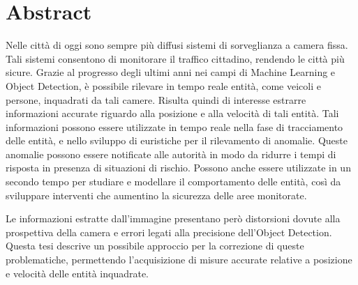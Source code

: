 \chapter*{Abstract}
Nelle città di oggi sono sempre più diffusi sistemi di sorveglianza a camera fissa.
Tali sistemi consentono di monitorare il traffico cittadino, rendendo le città più sicure.
Grazie al progresso degli ultimi anni nei campi di Machine Learning e Object Detection, è possibile rilevare in tempo reale entità, come veicoli e persone, inquadrati da tali camere.
Risulta quindi di interesse estrarre informazioni accurate riguardo alla posizione e alla velocità di tali entità. 
Tali informazioni possono essere utilizzate in tempo reale nella fase di tracciamento delle entità, e nello sviluppo di euristiche per il rilevamento di anomalie.
Queste anomalie possono essere notificate alle autorità in modo da ridurre i tempi di risposta in presenza di situazioni di rischio.
Possono anche essere utilizzate in un secondo tempo per studiare e modellare il comportamento delle entità, così da sviluppare interventi che aumentino la sicurezza delle aree monitorate.

Le informazioni estratte dall'immagine presentano però distorsioni dovute alla prospettiva della camera e errori legati alla precisione dell'Object Detection.
Questa tesi descrive un possibile approccio per la correzione di queste problematiche, permettendo l'acquisizione di misure accurate relative a posizione e velocità delle entità inquadrate.
